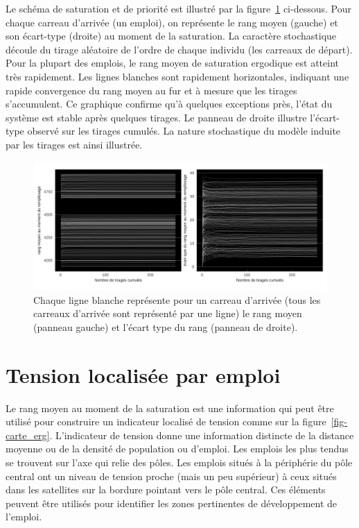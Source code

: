 \documentclass[
  10pt,
  a4paper,
  numbers=noendperiod,
  DIV=9]{scrartcl}
\begin{document}
Le schéma de saturation et de priorité est illustré par la
figure~\ref{fig-rangerg} ci-dessous. Pour chaque carreau d'arrivée (un
emploi), on représente le rang moyen (gauche) et son écart-type (droite)
au moment de la saturation. La caractère stochastique découle du tirage
aléatoire de l'ordre de chaque individu (les carreaux de départ). Pour
la plupart des emplois, le rang moyen de saturation ergodique est
atteint très rapidement. Les lignes blanches sont rapidement
horizontales, indiquant une rapide convergence du rang moyen au fur et à
mesure que les tirages s'accumulent. Ce graphique confirme qu'à quelques
exceptions près, l'état du système est stable après quelques tirages. Le
panneau de droite illustre l'écart-type observé sur les tirages cumulés.
La nature stochastique du modèle induite par les tirages est ainsi
illustrée.

\begin{figure}[htb]

{\centering \includegraphics[width=1\textwidth,height=\textheight]{output/g_rangns.png}

}

\caption[Rang au moment de la saturation]{\label{fig-rangerg}Chaque
ligne blanche représente pour un carreau d'arrivée (tous les carreaux
d'arrivée sont représenté par une ligne) le rang moyen (panneau gauche)
et l'écart type du rang (panneau de droite).}

\end{figure}

\hypertarget{tension-localisuxe9e-par-emploi}{%
\section{Tension localisée par
emploi}\label{tension-localisuxe9e-par-emploi}}

Le rang moyen au moment de la saturation est une information qui peut
être utilisé pour construire un indicateur localisé de tension comme sur
la figure~\ref{fig-carte_erg}. L'indicateur de tension donne une
information distincte de la distance moyenne ou de la densité de
population ou d'emploi. Les emplois les plus tendus se trouvent sur
l'axe qui relie des pôles. Les emplois situés à la périphérie du pôle
central ont un niveau de tension proche (mais un peu supérieur) à ceux
situés dans les satellites sur la bordure pointant vers le pôle central.
Ces éléments peuvent être utilisés pour identifier les zones pertinentes
de développement de l'emploi.
\end{document}
